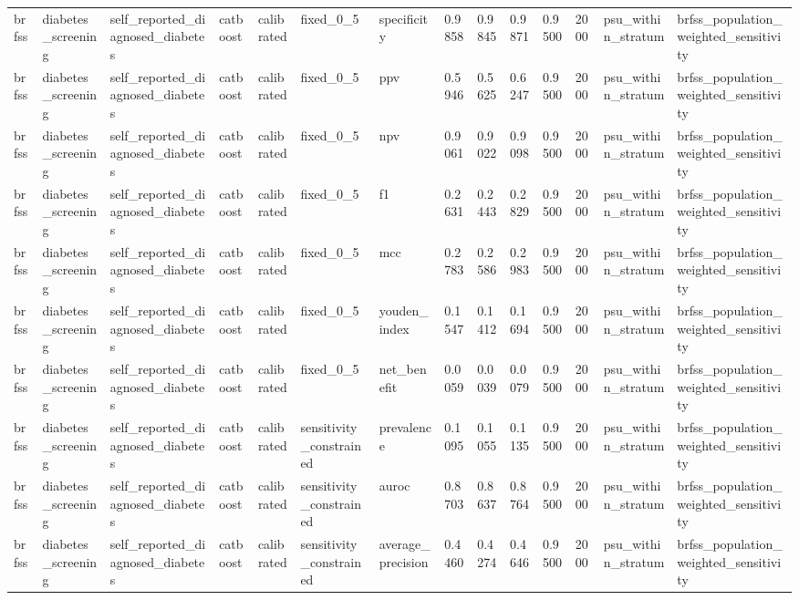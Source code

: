 \begin{tabular}{llllllllllllll}
brfss & diabetes\_screening & self\_reported\_diagnosed\_diabetes & catboost & calibrated & fixed\_0\_5 & specificity & 0.9858 & 0.9845 & 0.9871 & 0.9500 & 2000 & psu\_within\_stratum & brfss\_population\_weighted\_sensitivity \\
brfss & diabetes\_screening & self\_reported\_diagnosed\_diabetes & catboost & calibrated & fixed\_0\_5 & ppv & 0.5946 & 0.5625 & 0.6247 & 0.9500 & 2000 & psu\_within\_stratum & brfss\_population\_weighted\_sensitivity \\
brfss & diabetes\_screening & self\_reported\_diagnosed\_diabetes & catboost & calibrated & fixed\_0\_5 & npv & 0.9061 & 0.9022 & 0.9098 & 0.9500 & 2000 & psu\_within\_stratum & brfss\_population\_weighted\_sensitivity \\
brfss & diabetes\_screening & self\_reported\_diagnosed\_diabetes & catboost & calibrated & fixed\_0\_5 & f1 & 0.2631 & 0.2443 & 0.2829 & 0.9500 & 2000 & psu\_within\_stratum & brfss\_population\_weighted\_sensitivity \\
brfss & diabetes\_screening & self\_reported\_diagnosed\_diabetes & catboost & calibrated & fixed\_0\_5 & mcc & 0.2783 & 0.2586 & 0.2983 & 0.9500 & 2000 & psu\_within\_stratum & brfss\_population\_weighted\_sensitivity \\
brfss & diabetes\_screening & self\_reported\_diagnosed\_diabetes & catboost & calibrated & fixed\_0\_5 & youden\_index & 0.1547 & 0.1412 & 0.1694 & 0.9500 & 2000 & psu\_within\_stratum & brfss\_population\_weighted\_sensitivity \\
brfss & diabetes\_screening & self\_reported\_diagnosed\_diabetes & catboost & calibrated & fixed\_0\_5 & net\_benefit & 0.0059 & 0.0039 & 0.0079 & 0.9500 & 2000 & psu\_within\_stratum & brfss\_population\_weighted\_sensitivity \\
brfss & diabetes\_screening & self\_reported\_diagnosed\_diabetes & catboost & calibrated & sensitivity\_constrained & prevalence & 0.1095 & 0.1055 & 0.1135 & 0.9500 & 2000 & psu\_within\_stratum & brfss\_population\_weighted\_sensitivity \\
brfss & diabetes\_screening & self\_reported\_diagnosed\_diabetes & catboost & calibrated & sensitivity\_constrained & auroc & 0.8703 & 0.8637 & 0.8764 & 0.9500 & 2000 & psu\_within\_stratum & brfss\_population\_weighted\_sensitivity \\
brfss & diabetes\_screening & self\_reported\_diagnosed\_diabetes & catboost & calibrated & sensitivity\_constrained & average\_precision & 0.4460 & 0.4274 & 0.4646 & 0.9500 & 2000 & psu\_within\_stratum & brfss\_population\_weighted\_sensitivity \\

\end{tabular}
